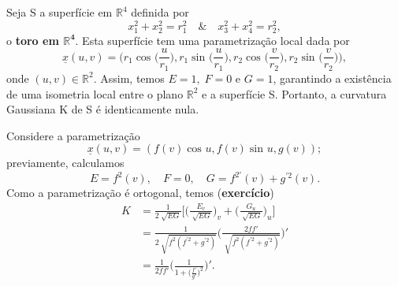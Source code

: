 \documentclass[../differential_geometry.tex]{subfiles}
\begin{document}
\begin{example}
	Seja S a superfície em \(\mathbb{R}^{4}\) definida por
	\[
		x_{1}^{2} + x_{2}^{2}= r_{1}^{2} \quad\&\quad x_{3}^{2} + x_{4}^{2}=r_{2}^{2},
	\]
	o \textbf{toro em \(\mathbf{\mathbb{R}^{4}}\)}. Esta superfície tem uma parametrização local dada por
	\[
		\underline{x}(u, v) = \biggl(r_1\cos^{}{\biggl(\frac{u}{r_1}\biggr)}, r_1 \sin^{}{\biggl(\frac{u}{r_1}\biggr)}, r_2 \cos^{}{\biggl(\frac{v}{r_{2}}\biggr), r_2 \sin^{}{\biggl(\frac{v}{r_2}\biggr)}}\biggr),
	\]
	onde \((u, v)\in \mathbb{R}^{2}\). Assim, temos \(E = 1,\; F = 0\) e \(G=1\), garantindo a existência de uma isometria local entre o plano \(\mathbb{R}^{2}\) e a superfície S. Portanto, a curvatura Gaussiana K de S é identicamente nula.
\end{example}

\begin{example}
	Considere a parametrização
	\[
		\underline{x}(u, v) = (f(v)\cos^{}{u}, f(v)\sin^{}{u}, g(v));
	\]
	previamente, calculamos
	\[
		E = f^{2}(v), \quad F = 0, \quad G = f^{2'}(v) + g^{'2}(v).
	\]
	Como a parametrização é ortogonal, temos (\textbf{exercício})
	\begin{align*}
		K & = \frac{1}{2\sqrt[]{EG}}\biggl[\biggl(\frac{E_{v}}{\sqrt[]{EG}}\biggr)_{v} + \biggl(\frac{G_{u}}{\sqrt[]{EG}}\biggr)_{u}\biggr] \\
		  & = \frac{1}{2\sqrt[]{f^{2}(f^{'2}+g^{'2})}}\biggl(\frac{2ff'}{\sqrt[]{f^{2}(f^{'2}+g^{'2})}}\biggr)'                             \\
		  & = \frac{1}{2ff'}\biggl(\frac{1}{1+\bigl(\frac{f'}{g'}\bigr)^{2}}\biggr)'.
	\end{align*}
\end{example}
\end{document}
